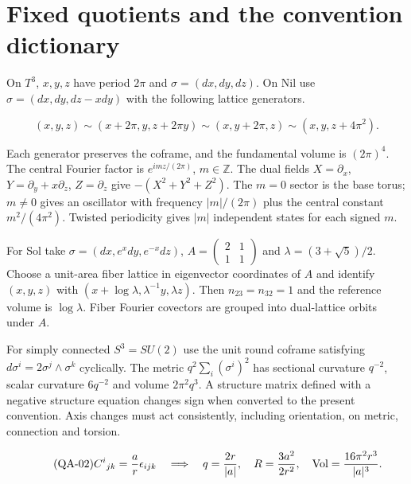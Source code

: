 \section{Fixed quotients and the convention dictionary}

On $T^3$, $x,y,z$ have period $2\pi$ and $\sigma=(dx,dy,dz)$. On Nil use $\sigma=(dx,dy,dz-xdy)$ with the following lattice generators.

\begin{equation}\tag{QA-01}\label{eq:QA-01}
(x,y,z)\sim(x+2\pi,y,z+2\pi y)\sim(x,y+2\pi,z)\sim(x,y,z+4\pi^2).
\end{equation}

Each generator preserves the coframe, and the fundamental volume is $(2\pi)^4$. The central Fourier factor is $e^{imz/(2\pi)}$, $m\in\mathbb Z$. The dual fields $X=\partial_x$, $Y=\partial_y+x\partial_z$, $Z=\partial_z$ give $-(X^2+Y^2+Z^2)$. The $m=0$ sector is the base torus; $m\ne0$ gives an oscillator with frequency $|m|/(2\pi)$ plus the central constant $m^2/(4\pi^2)$. Twisted periodicity gives $|m|$ independent states for each signed $m$.

For Sol take $\sigma=(dx,e^xdy,e^{-x}dz)$, $A=\left(\begin{smallmatrix}2&1\\1&1\end{smallmatrix}\right)$ and $\lambda=(3+\sqrt5)/2$. Choose a unit-area fiber lattice in eigenvector coordinates of $A$ and identify $(x,y,z)$ with $(x+\log\lambda,\lambda^{-1}y,\lambda z)$. Then $n_{23}=n_{32}=1$ and the reference volume is $\log\lambda$. Fiber Fourier covectors are grouped into dual-lattice orbits under $A$.

For simply connected $S^3=SU(2)$ use the unit round coframe satisfying $d\sigma^i=2\sigma^j\wedge\sigma^k$ cyclically. The metric $q^2\sum_i(\sigma^i)^2$ has sectional curvature $q^{-2}$, scalar curvature $6q^{-2}$ and volume $2\pi^2q^3$. A structure matrix defined with a negative structure equation changes sign when converted to the present convention. Axis changes must act consistently, including orientation, on metric, connection and torsion.

\begin{equation}\tag{QA-02}\label{eq:QA-02}
C^i{}_{jk}=\frac{a}{r}\epsilon_{ijk}\quad\Longrightarrow\quad q=\frac{2r}{|a|},\quad R=\frac{3a^2}{2r^2},\quad {\rm Vol}=\frac{16\pi^2r^3}{|a|^3}.
\end{equation}

